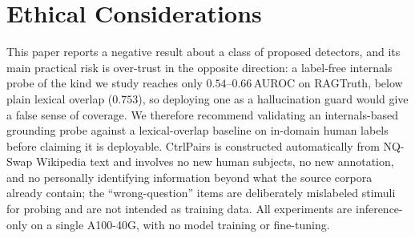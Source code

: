 \section*{Ethical Considerations}
This paper reports a negative result about a class of proposed detectors, and its
main practical risk is over-trust in the opposite direction: a label-free internals
probe of the kind we study reaches only $0.54$--$0.66$\,AUROC on RAGTruth, below plain
lexical overlap ($0.753$), so deploying one as a hallucination guard would give a false
sense of coverage. We therefore recommend validating an internals-based grounding probe
against a lexical-overlap baseline on in-domain human labels before claiming it is
deployable. CtrlPairs is constructed automatically from NQ-Swap Wikipedia
text and involves no new human subjects, no new annotation, and no personally
identifying information beyond what the source corpora already contain; the
``wrong-question'' items are deliberately mislabeled stimuli for probing and are not
intended as training data. All experiments are inference-only on a single A100-40G,
with no model training or fine-tuning.